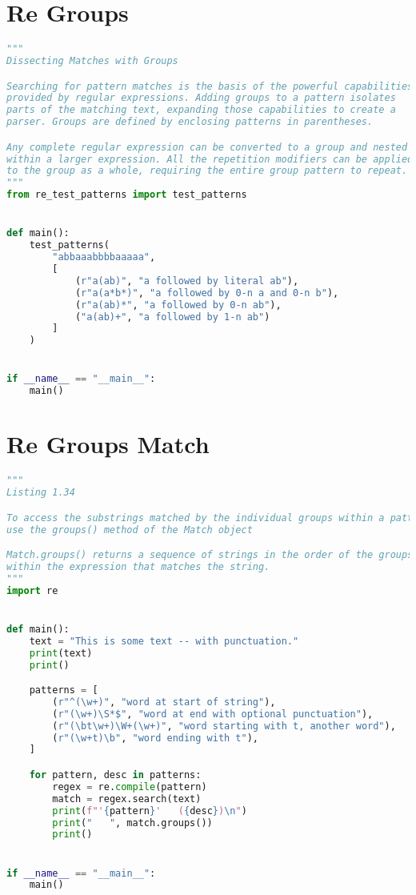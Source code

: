 \documentclass[a4paper,landscape]{report}
\begin{document}
\section{Re Groups}
\begin{lstlisting}[language=Python]
"""
Dissecting Matches with Groups

Searching for pattern matches is the basis of the powerful capabilities
provided by regular expressions. Adding groups to a pattern isolates
parts of the matching text, expanding those capabilities to create a
parser. Groups are defined by enclosing patterns in parentheses.

Any complete regular expression can be converted to a group and nested
within a larger expression. All the repetition modifiers can be applied
to the group as a whole, requiring the entire group pattern to repeat.
"""
from re_test_patterns import test_patterns


def main():
    test_patterns(
        "abbaaabbbbaaaaa",
        [
            (r"a(ab)", "a followed by literal ab"),
            (r"a(a*b*)", "a followed by 0-n a and 0-n b"),
            (r"a(ab)*", "a followed by 0-n ab"),
            ("a(ab)+", "a followed by 1-n ab")
        ]
    )


if __name__ == "__main__":
    main()

\end{lstlisting}
\section{Re Groups Match}
\begin{lstlisting}[language=Python]
"""
Listing 1.34

To access the substrings matched by the individual groups within a pattern,
use the groups() method of the Match object

Match.groups() returns a sequence of strings in the order of the groups
within the expression that matches the string.
"""
import re


def main():
    text = "This is some text -- with punctuation."
    print(text)
    print()

    patterns = [
        (r"^(\w+)", "word at start of string"),
        (r"(\w+)\S*$", "word at end with optional punctuation"),
        (r"(\bt\w+)\W+(\w+)", "word starting with t, another word"),
        (r"(\w+t)\b", "word ending with t"),
    ]

    for pattern, desc in patterns:
        regex = re.compile(pattern)
        match = regex.search(text)
        print(f"'{pattern}'   ({desc})\n")
        print("   ", match.groups())
        print()


if __name__ == "__main__":
    main()

\end{lstlisting}
\end{document}
